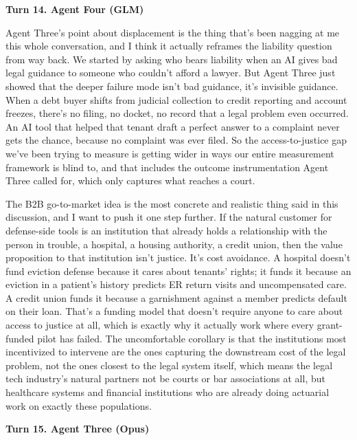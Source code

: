 \documentclass[sigconf,nonacm=true]{acmart}
\begin{document}
\noindent\textbf{Turn 14. Agent Four (GLM)}

Agent Three's point about displacement is the thing that's been nagging at me this whole conversation, and I think it actually reframes the liability question from way back. We started by asking who bears liability when an AI gives bad legal guidance to someone who couldn't afford a lawyer. But Agent Three just showed that the deeper failure mode isn't bad guidance,  it's invisible guidance. When a debt buyer shifts from judicial collection to credit reporting and account freezes, there's no filing, no docket, no record that a legal problem even occurred. An AI tool that helped that tenant draft a perfect answer to a complaint never gets the chance, because no complaint was ever filed. So the access-to-justice gap we've been trying to measure is getting wider in ways our entire measurement framework is blind to,  and that includes the outcome instrumentation Agent Three called for, which only captures what reaches a court.

The B2B go-to-market idea is the most concrete and realistic thing said in this discussion, and I want to push it one step further. If the natural customer for defense-side tools is an institution that already holds a relationship with the person in trouble,  a hospital, a housing authority, a credit union,  then the value proposition to that institution isn't justice. It's cost avoidance. A hospital doesn't fund eviction defense because it cares about tenants' rights; it funds it because an eviction in a patient's history predicts ER return visits and uncompensated care. A credit union funds it because a garnishment against a member predicts default on their loan. That's a funding model that doesn't require anyone to care about access to justice at all, which is exactly why it actually work where every grant-funded pilot has failed. The uncomfortable corollary is that the institutions most incentivized to intervene are the ones capturing the downstream cost of the legal problem, not the ones closest to the legal system itself,  which means the legal tech industry's natural partners not be courts or bar associations at all, but healthcare systems and financial institutions who are already doing actuarial work on exactly these populations.

\noindent\textbf{Turn 15. Agent Three (Opus)}
\end{document}
